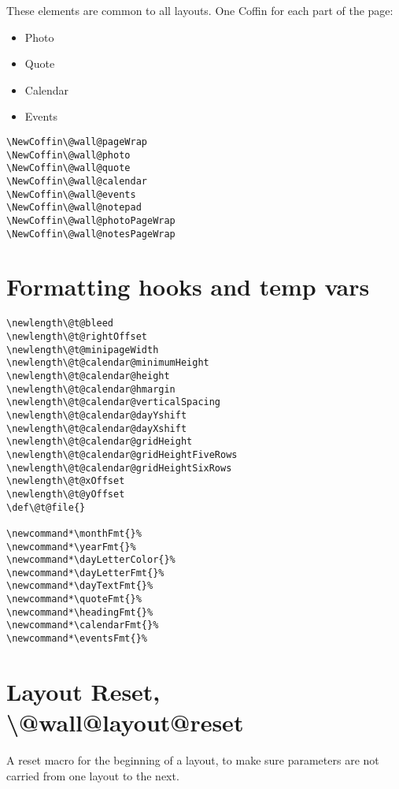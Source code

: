 \documentclass[11pt,oneside]{memoir-article}
\begin{document}
These elements are common to all layouts. One Coffin for each part of the
page:

\begin{itemize}
\item Photo
\item Quote
\item Calendar
\item Events
\end{itemize}

\begin{verbatim}
\NewCoffin\@wall@pageWrap
\NewCoffin\@wall@photo
\NewCoffin\@wall@quote
\NewCoffin\@wall@calendar
\NewCoffin\@wall@events
\NewCoffin\@wall@notepad
\NewCoffin\@wall@photoPageWrap
\NewCoffin\@wall@notesPageWrap
\end{verbatim}

\section{Formatting hooks and temp vars}
\label{sec:org1d0e47d}

\begin{verbatim}
\newlength\@t@bleed
\newlength\@t@rightOffset
\newlength\@t@minipageWidth
\newlength\@t@calendar@minimumHeight
\newlength\@t@calendar@height
\newlength\@t@calendar@hmargin
\newlength\@t@calendar@verticalSpacing
\newlength\@t@calendar@dayYshift
\newlength\@t@calendar@dayXshift
\newlength\@t@calendar@gridHeight
\newlength\@t@calendar@gridHeightFiveRows
\newlength\@t@calendar@gridHeightSixRows
\newlength\@t@xOffset
\newlength\@t@yOffset
\def\@t@file{}

\newcommand*\monthFmt{}%
\newcommand*\yearFmt{}%
\newcommand*\dayLetterColor{}%
\newcommand*\dayLetterFmt{}%
\newcommand*\dayTextFmt{}%
\newcommand*\quoteFmt{}%
\newcommand*\headingFmt{}%
\newcommand*\calendarFmt{}%
\newcommand*\eventsFmt{}%
\end{verbatim}

\section{Layout Reset, \textbackslash @wall@layout@reset}
\label{sec:orgb350048}

A reset macro for the beginning of a layout, to make sure parameters are not
carried from one layout to the next.
\end{document}
